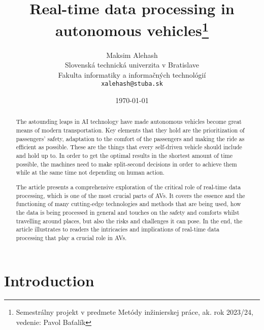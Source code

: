 \documentclass[10pt,oneside,english,a4paper]{article}
\title{Real-time data processing in autonomous vehicles\thanks{Semestrálny projekt v predmete Metódy inžinierskej práce, ak. rok 2023/24, vedenie: Pavol Baťalík}} %
\author{Maksim Alehash\\[2pt]
	{\small Slovenská technická univerzita v Bratislave}\\
	{\small Fakulta informatiky a informačných technológií}\\
	{\small \texttt{xalehash@stuba.sk}}
	}
\date{\small\today} %
\begin{document}
\maketitle

\begin{abstract}
The astounding leaps in AI technology have made autonomous vehicles become great means of modern transportation. Key elements that they hold are the prioritization of passengers' safety, adaptation to the comfort of the passengers and making the ride as efficient as possible. These are the things that every self-driven vehicle should include and hold up to. In order to get the optimal results in the shortest amount of time possible, the machines need to make split-second decisions in order to achieve them while at the same time not depending on human action. 
\par The article presents a comprehensive exploration of the critical role of real-time data processing, which is one of the most crucial parts of AVs. It covers the essence and the functioning of many cutting-edge technologies and methods that are being used, how the data is being processed in general and touches on the safety and comforts whilst travelling around places, but also the risks and challenges it can pose. In the end, the article illustrates to readers the intricacies and implications of real-time data processing that play a crucial role in AVs.
\end{abstract}

\newpage\tableofcontents

\newpage\section{Introduction}
\end{document}
